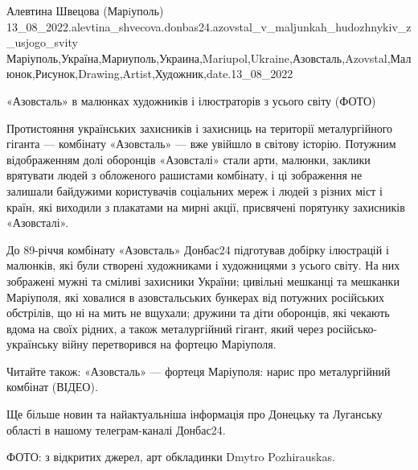  
 
 
 
 

Алевтина Швецова (Марiуполь)
13_08_2022.alevtina_shvecova.donbas24.azovstal_v_maljunkah_hudozhnykiv_z_usjogo_svity
Маріуполь,Україна,Мариуполь,Украина,Mariupol,Ukraine,Азовсталь,Azovstal,Малюнок,Рисунок,Drawing,Artist,Художник,date.13_08_2022

«Азовсталь» в малюнках художників і ілюстраторів з усього світу (ФОТО)

Протистояння українських захисників і захисниць на території металургійного
гіганта — комбінату «Азовсталь» — вже увійшло в світову історію. Потужним
відображенням долі оборонців «Азовсталі» стали арти, малюнки, заклики врятувати
людей з обложеного рашистами комбінату, і ці зображення не залишали байдужими
користувачів соціальних мереж і людей з різних міст і країн, які виходили з
плакатами на мирні акції, присвячені порятунку захисників «Азовсталі».

До 89-річчя комбінату «Азовсталь» Донбас24 підготував добірку ілюстрацій і
малюнків, які були створені художниками і художницями з усього світу. На них
зображені мужні та сміливі захисники України; цивільні мешканці та мешканки
Маріуполя, які ховалися в азовстальських бункерах від потужних російських
обстрілів, що ні на мить не вщухали; дружини та діти оборонців, які чекають
вдома на своїх рідних, а також металургійний гігант, який через
російсько-українську війну перетворився на фортецю Маріуполя.

Читайте також: «Азовсталь» — фортеця Маріуполя: нарис про металургійний
комбінат (ВІДЕО).

Ще більше новин та найактуальніша інформація про Донецьку та Луганську області
в нашому телеграм-каналі Донбас24.

ФОТО: з відкритих джерел, арт обкладинки Dmytro Pozhirauskas.
